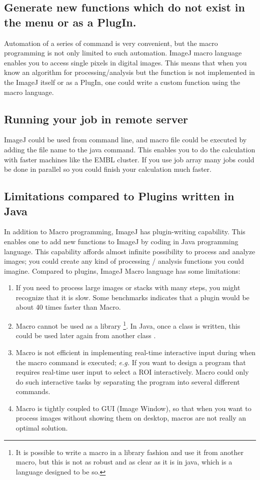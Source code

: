 \documentclass[11pt,a4paper,oneside]{report}
\begin{document}
\subsection{Generate new functions which do not exist in the menu or as a PlugIn.}
Automation of a series of command is very convenient, 
but the macro programming is not only limited to such automation. 
ImageJ macro language enables you to access single pixels in digital images. 
This means that when you know an algorithm for processing/analysis 
but the function is not implemented in the ImageJ 
itself or as a PlugIn, one could write a custom function using the macro language.
\subsection{Running your job in remote server}
ImageJ could be used from command line, and macro file could be executed by 
adding the file name to the java command. 
This enables you to do the calculation with faster machines like the EMBL cluster. 
If you use job array many jobs could be done in parallel so you could finish your calculation much faster.

\subsection{Limitations compared to Plugins written in Java}

In addition to Macro programming, ImageJ has plugin-writing capability.  This enables one to add new functions to ImageJ by coding in Java programming language. 
This capability affords almost infinite possibility to process and analyze images; 
you could create any kind of processing / analysis functions you could imagine. 
Compared to plugins, ImageJ Macro language has some limitations: 

\begin{enumerate}
\item If you need to process large images or stacks with many steps, 
you might recognize that it is slow. 
Some benchmarks indicates that a plugin would be about 40 times faster than Macro. 

\item Macro cannot be used as a library
\footnote{It is possible to write a macro in a library fashion and use it from another macro, 
but this is not as robust and as clear as it is in java, which is a language designed to be so.}. 
In Java, once a class is written, this could be used later again from another class . 

\item Macro is not efficient in implementing real-time interactive input 
during when the macro command is executed; 
\textit{e.g.} If you want to design a program that requires real-time user input 
to select a ROI interactively.  
Macro could only do such interactive tasks by separating the program into several different commands. 

\item Macro is tightly coupled to GUI (Image Window), so that when you want to process images without showing them on desktop, macros are not really an optimal solution.  
\end{enumerate}
\end{document}

